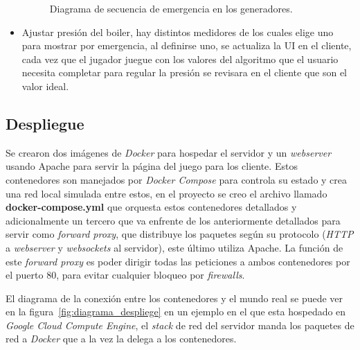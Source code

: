 \begin{itemize}
\begin{figure}[H]
            \caption{Diagrama de secuencia de emergencia en los generadores.}
            \label{fig:diagrama_secuencia_generadores}
        \end{figure}
    \item Ajustar presión del boiler, hay distintos medidores de los cuales elige uno para mostrar por emergencia, al definirse uno, se actualiza la UI en el cliente, cada vez que el jugador juegue con los valores del algoritmo que el usuario necesita completar para regular la presión se revisara en el cliente que son el valor ideal.
\end{itemize}

\subsection{Despliegue}

Se crearon dos imágenes de \textit{Docker} para hospedar el servidor y un \textit{webserver} usando Apache para servir la página del juego para los cliente. Estos contenedores son manejados por \textit{Docker Compose} para controla su estado y crea una red local simulada entre estos, en el proyecto se creo el archivo llamado \textbf{docker-compose.yml} que orquesta estos contenedores detallados y adicionalmente un tercero que va enfrente de los anteriormente detallados para servir como \textit{forward proxy}, que distribuye los paquetes según su protocolo (\textit{HTTP} a \textit{webserver} y \textit{websockets} al servidor), este último utiliza Apache. La función de este \textit{forward proxy} es poder dirigir todas las peticiones a ambos contenedores por el puerto 80, para evitar cualquier bloqueo por \textit{firewalls}. 

El diagrama de la conexión entre los contenedores y el mundo real se puede ver en la figura~\ref{fig:diagrama_despliege} en un ejemplo en el que esta hospedado en \textit{Google Cloud Compute Engine}, el \textit{stack} de red del servidor manda los paquetes de red a \textit{Docker} que a la vez la delega a los contenedores.

